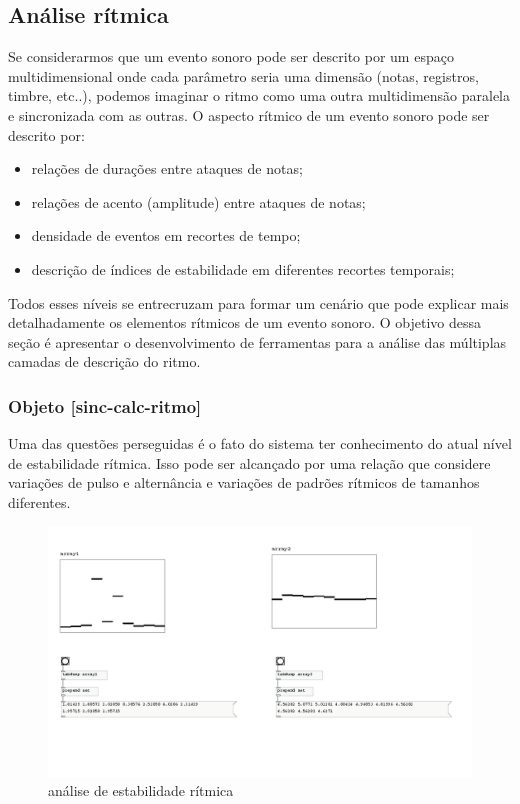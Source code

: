 \documentclass{ppgmus}
\begin{document}
\subsection{Análise rítmica}

Se considerarmos que um evento sonoro pode ser descrito por um espaço multidimensional
onde cada parâmetro seria uma dimensão (notas, registros, timbre, etc..), podemos
imaginar o ritmo como uma outra multidimensão paralela e sincronizada com as outras.
O aspecto rítmico de um evento sonoro pode ser descrito por:
\begin{itemize}
 \item relações de durações entre ataques de notas;
\item relações de acento (amplitude) entre ataques de notas;
\item densidade de eventos em recortes de tempo;
\item descrição de índices de estabilidade em diferentes recortes temporais;
\end{itemize}

Todos esses níveis se entrecruzam para formar um cenário que pode explicar mais detalhadamente
os elementos rítmicos de um evento sonoro. O objetivo dessa seção é apresentar o desenvolvimento de
ferramentas para a análise das múltiplas camadas de descrição do ritmo.


% 



\subsubsection{Objeto [sinc-calc-ritmo]}

Uma das questões perseguidas é o fato do sistema ter conhecimento do atual nível de 
estabilidade rítmica. Isso pode ser alcançado por uma relação que considere variações
de pulso e alternância e variações de padrões rítmicos de tamanhos diferentes.

\begin{figure}
\includegraphics[scale=.6]{prot5a}
\caption{análise de estabilidade rítmica}
\label{prot5a}
\end{figure} 
\end{document}
